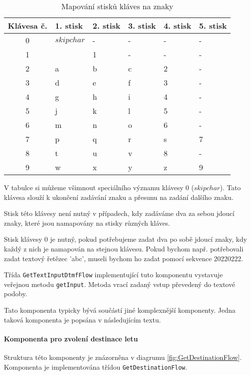\documentclass[ing,male,java,dept460]{diploma}						%
\begin{document}
\begin{table}
	\centering
	\begin{tabular}{|c|l|l|l|l|l|}
		\hline
		Klávesa č. & 1. stisk & 2. stisk & 3. stisk & 4. stisk & 5. stisk \\
		\hline
		0 & $skipchar$ & - & - & - & -  \\
		\hline
		1 & \textvisiblespace & 1 & - & - & - \\
		\hline
		2 & a & b & c & 2 & - \\
		\hline
		3 & d & e & f & 3 & - \\
		\hline
		4 & g & h & i & 4 & - \\
		\hline
		5 & j & k & l & 5 & - \\
		\hline
		6 & m & n & o & 6 & - \\
		\hline
		7 & p & q & r & s & 7 \\
		\hline
		8 & t & u & v & 8 & - \\
		\hline
		9 & w & x & y & z & 9 \\
		\hline
	\end{tabular}
	\caption{Mapování stisků kláves na znaky}
	\label{tab:GetTextInputDtmfFlow_mapping}
\end{table}

V tabulce si můžeme všimnout speciálního významu klávesy 0 ($skipchar$). Tato klávesa slouží k ukončení zadávání znaku a přesunu na zadání dalšího znaku.

Stisk této klávesy není nutný v případech, kdy zadáváme dva za sebou jdoucí znaky, které jsou namapovány na stisky různých kláves.

Stisk klávesy 0 je nutný, pokud potřebujeme zadat dva po sobě jdoucí znaky, kdy každý z nich je namapován na stejnou klávesu. Pokud bychom např. potřebovali zadat textový řetězec 'abc', museli bychom ho zadat pomocí sekvence 20220222.

Třída \texttt{GetTextInputDtmfFlow} implementující tuto komponentu vystavuje veřejnou metodu \texttt{getInput}. Metoda vrací zadaný vstup převedený do textové podoby.

Tato komponenta typicky bývá součástí jiné komplexnější komponenty. Jedna taková komponenta je popsána v následujícím textu.


\paragraph{Komponenta pro zvolení destinace letu}
Struktura této komponenty je znázorněna v diagrumu \ref{fig:GetDestinationFlow}. Komponenta je implementována třídou \texttt{GetDestinationFlow}.
\end{document}
